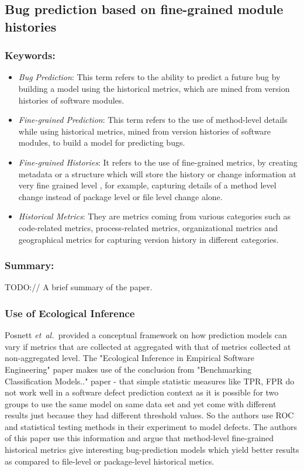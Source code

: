 \documentclass{sig-alternate-05-2015}
\newcommand{\etal}{\mbox{\emph{et al.\ }}}
\begin{document}
\subsection{Bug prediction based on fine-grained module histories \cite{Hata:2012}}

\subsubsection{Keywords:}
\begin{itemize}
\item \emph{Bug Prediction}:  This term refers to the ability to predict a future bug by building a model using the historical metrics, which are mined from version histories of software modules.
\item \emph{Fine-grained Prediction}: This term refers to the use of method-level details while using historical metrics, mined from version histories of software modules, to build a model for predicting bugs.
\item \emph{Fine-grained Histories}: It refers to the use of fine-grained metrics, by creating metadata or a structure which will store the history or change information at very fine grained level , for example, capturing details of a method level change instead of package level or file level change alone.
\item \emph{Historical Metrics}: They are metrics coming from various categories such as code-related metrics, process-related metrics, organizational metrics and geographical metrics for capturing version history in different categories.
\end{itemize} 

\subsubsection{Summary:}
TODO:// A brief summary of the paper.

\subsubsection{Use of Ecological Inference}
Posnett \etal provided a conceptual framework on how prediction models can vary if metrics that are collected at aggregated with that of metrics collected at non-aggregated level. The "Ecological Inference in Empirical Software Engineering" paper makes use of the conclusion from "Benchmarking Classification Models.." paper - that simple statistic measures like TPR, FPR do not work well in a software defect prediction context as it is possible for two groups to use the same model on same data set and yet come with different results just because they had different threshold values. So the authors use ROC and statistical testing methods in their experiment to model defects. The authors of this paper use this information and argue that method-level fine-grained historical metrics give interesting bug-prediction models which yield better results as compared to file-level or package-level historical metics.
\end{document}
